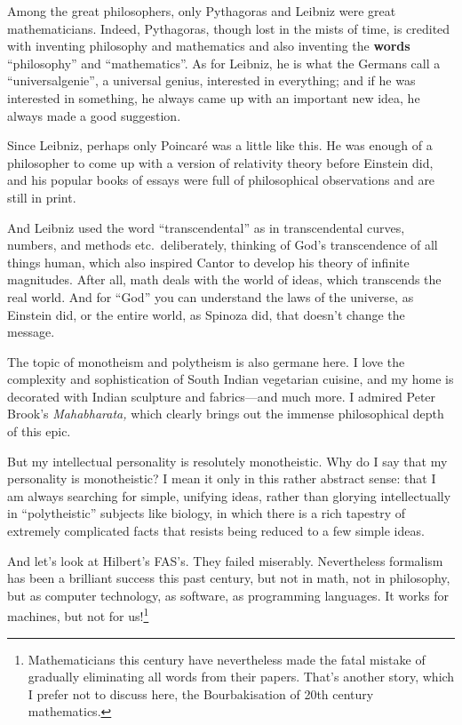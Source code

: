 \documentclass[12pt]{book}
\begin{document}
Among the great philosophers, only Pythagoras and Leibniz were great 
mathematicians.  Indeed, Pythagoras, though lost in the mists of time,
is credited with inventing philosophy and mathematics and also inventing
the \textbf{words} ``philosophy'' and ``mathematics''.
As for Leibniz, he is what the Germans call a ``universalgenie'', a universal
genius, interested in everything; and if he was interested in something, 
he always came up with an important new idea, 
he always made
a good suggestion.
 
Since Leibniz, perhaps only Poincar\'e was a little like this.
He was enough of a philosopher to come up with a version of relativity theory before Einstein did,
and his popular books of essays were full of philosophical observations and are
still in print.
 
And Leibniz used the word ``transcendental'' as in transcendental curves, numbers, and methods
etc.\ deliberately, thinking of God's transcendence of all things human, 
which also inspired Cantor to develop his theory of infinite magnitudes.
After all, math deals with the world of ideas, which transcends the real world.
And for ``God'' you can understand the laws of the universe, as Einstein did, or the entire world,
as Spinoza did, that doesn't change the message.
 
The topic of monotheism and polytheism is also germane here. I love
the complexity and sophistication of South Indian vegetarian cuisine, and my
home is decorated with Indian sculpture and fabrics---and much more.
I admired
Peter Brook's \emph{Mahabharata,} which clearly brings out the immense philosophical depth
of this epic.
 
But my intellectual personality is resolutely monotheistic.
Why do I say that my personality is monotheistic? I mean it only in this rather abstract sense:
that I am always searching for simple, unifying ideas, rather than glorying intellectually
in ``polytheistic'' subjects like biology, in which there 
is a rich tapestry of extremely complicated facts
that resists being reduced to a few simple ideas. 
 
And let's look at Hilbert's FAS's. They failed miserably. Nevertheless formalism has been
a brilliant success this past century, but not in math, not in philosophy, but as computer
technology, as software, as programming languages.
It works for machines, but not for us!\footnote
{Mathematicians this century have nevertheless made the fatal mistake of 
gradually eliminating all words
from their papers. That's another story, which I prefer not to discuss here, the Bourbakisation
of 20th century mathematics.}
 
\end{document}
